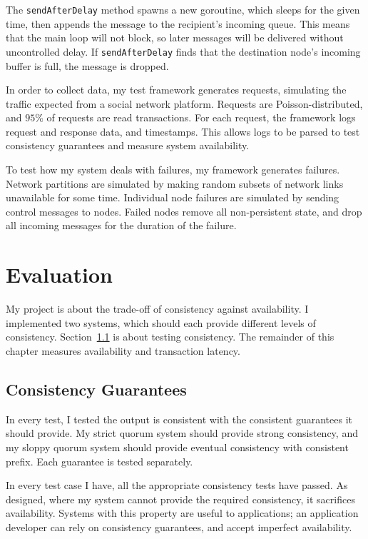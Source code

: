 \documentclass[12pt,a4paper,twoside,openany]{report}
\begin{document}
The \verb|sendAfterDelay| method spawns a new goroutine, which sleeps for the given time, then appends the message to the recipient's incoming queue. This means that the main loop will not block, so later messages will be delivered without uncontrolled delay. If \verb|sendAfterDelay| finds that the destination node's incoming buffer is full, the message is dropped.

In order to collect data, my test framework generates requests, simulating the traffic expected from a social network platform. Requests are Poisson-distributed, and $95\%$ of requests are read transactions. For each request, the framework logs request and response data, and timestamps. This allows logs to be parsed to test consistency guarantees and measure system availability.

To test how my system deals with failures, my framework generates failures. Network partitions are simulated by making random subsets of network links unavailable for some time. Individual node failures are simulated by sending control messages to nodes. Failed nodes remove all non-persistent state, and drop all incoming messages for the duration of the failure.

\chapter{Evaluation}

My project is about the trade-off of consistency against availability. I implemented two systems, which should each provide different levels of consistency. Section~\ref{consg} is about testing consistency. The remainder of this chapter measures availability and transaction latency.

\section{Consistency Guarantees} \label{consg}

In every test, I tested the output is consistent with the consistent guarantees it should provide. My strict quorum system should provide strong consistency, and my sloppy quorum system should provide eventual consistency with consistent prefix. Each guarantee is tested separately.

In every test case I have, all the appropriate consistency tests have passed. As designed, where my system cannot provide the required consistency, it sacrifices availability. Systems with this property are useful to applications; an application developer can rely on consistency guarantees, and accept imperfect availability.
\end{document}
